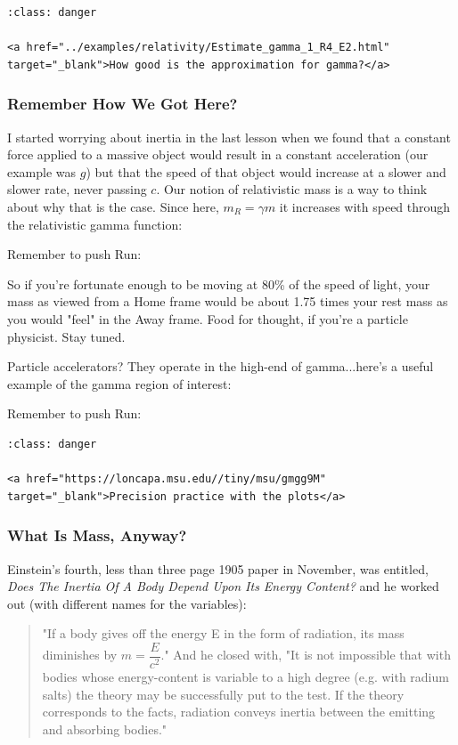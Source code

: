 \documentclass[
]{article}
\begin{document}
\begin{verbatim}
:class: danger

<a href="../examples/relativity/Estimate_gamma_1_R4_E2.html" target="_blank">How good is the approximation for gamma?</a>
\end{verbatim}

\hypertarget{remember-how-we-got-here}{%
\subsubsection{Remember How We Got
Here?}\label{remember-how-we-got-here}}

I started worrying about inertia in the last lesson when we found that a
constant force applied to a massive object would result in a constant
acceleration (our example was \(g\)) but that the speed of that object
would increase at a slower and slower rate, never passing \(c\). Our
notion of relativistic mass is a way to think about why that is the
case. Since here, \(m_R = \gamma m\) it increases with speed through the
relativistic gamma function:

Remember to push Run:

So if you're fortunate enough to be moving at 80\% of the speed of
light, your mass as viewed from a Home frame would be about 1.75 times
your rest mass as you would "feel" in the Away frame. Food for thought,
if you're a particle physicist. Stay tuned.

Particle accelerators? They operate in the high-end of gamma...here's a
useful example of the gamma region of interest:

Remember to push Run:

\begin{verbatim}
:class: danger

<a href="https://loncapa.msu.edu//tiny/msu/gmgg9M"  target="_blank">Precision practice with the plots</a>
\end{verbatim}

\hypertarget{what-is-mass-anyway}{%
\subsubsection{What Is Mass, Anyway?}\label{what-is-mass-anyway}}

Einstein's fourth, less than three page 1905 paper in November, was
entitled, \emph{Does The Inertia Of A Body Depend Upon Its Energy
Content?} and he worked out (with different names for the variables):

\begin{quote}
"If a body gives off the energy E in the form of radiation, its mass
diminishes by \(m=\dfrac{E}{c^2}\)." And he closed with, "It is not
impossible that with bodies whose energy-content is variable to a high
degree (e.g. with radium salts) the theory may be successfully put to
the test. If the theory corresponds to the facts, radiation conveys
inertia between the emitting and absorbing bodies."
\end{quote}
\end{document}
